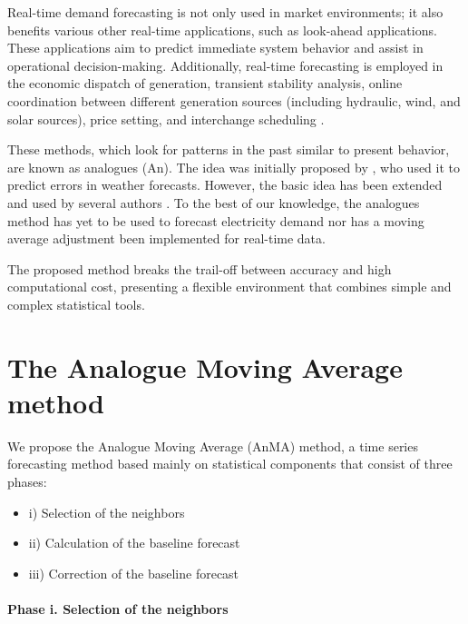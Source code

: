 Real-time demand forecasting is not only used in market environments; it also benefits various other real-time applications, such as look-ahead applications. These applications aim to predict immediate system behavior and assist in operational decision-making. Additionally, real-time forecasting is employed in the economic dispatch of generation, transient stability analysis, online coordination between different generation sources (including hydraulic, wind, and solar sources), price setting, and interchange scheduling \cite{Fan1994}.

These methods, which look for patterns in the past similar to present behavior, are known as analogues (An). The idea was initially proposed by \cite{Monache2013}, who used it to predict errors in weather forecasts. However, the basic idea has been extended and used by several authors \cite{CostaEA2021,Alessandrini2014,Alessandrini2015,Alessandrini2015b}. 
To the best of our knowledge, the analogues method has yet to be used to forecast electricity demand nor has a moving average adjustment been implemented for real-time data.

The proposed method breaks the trail-off between accuracy and high computational cost, presenting a flexible environment that combines simple and complex statistical tools.





\section{The Analogue Moving Average method}

We propose the Analogue Moving Average (AnMA) method, a time series forecasting method based mainly on statistical components that consist of three phases: 
\begin{itemize}
    \item i)   Selection of the neighbors
    \item ii)  Calculation of the baseline forecast
    \item iii) Correction of the baseline forecast
\end{itemize}



\paragraph{Phase i. Selection of the neighbors}
\label{sec:an_method}

